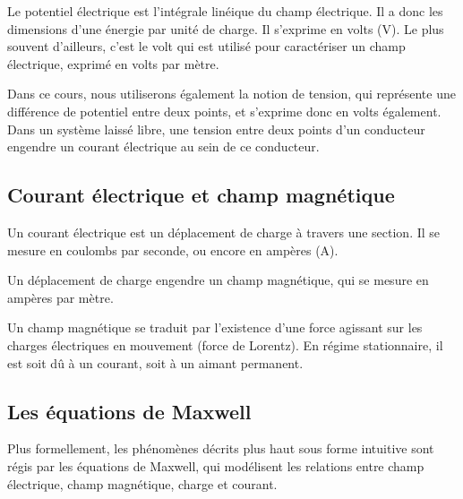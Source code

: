 Le potentiel électrique est l'intégrale linéique du champ électrique. Il a donc les dimensions d'une énergie par unité de charge. Il s'exprime en volts (V). Le plus souvent d'ailleurs, c'est le volt qui est utilisé pour caractériser un champ électrique, exprimé en volts par mètre.

Dans ce cours, nous utiliserons également la notion de tension, qui représente une différence de potentiel entre deux points, et s'exprime donc en volts également. Dans un système laissé libre, une tension entre deux points d'un conducteur engendre un courant électrique au sein de ce conducteur.

\subsection{Courant électrique et champ magnétique}

Un courant électrique est un déplacement de charge à travers une section. Il se mesure en coulombs par seconde, ou encore en ampères (A).

Un déplacement de charge engendre un champ magnétique, qui se mesure en ampères par mètre. 

Un champ magnétique se traduit par l'existence d'une force agissant sur les charges électriques en mouvement (force de Lorentz). En régime stationnaire, il est soit dû à un courant, soit à un aimant permanent.

\subsection{Les équations de Maxwell}

Plus formellement, les phénomènes décrits plus haut sous forme intuitive sont régis par les équations de Maxwell, qui modélisent les relations entre champ électrique, champ magnétique, charge et courant.

